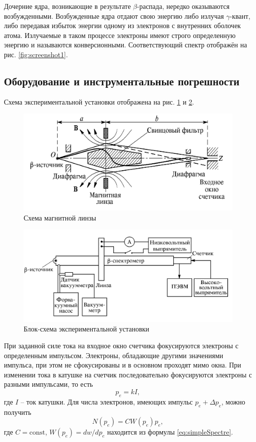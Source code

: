 \documentclass[a4paper,12pt]{article}
\theoremstyle{definition}
\newcommand{\const}{\mathrm{const}}
\newcommand{\gmm}{$\gamma $}
\newcommand{\btt}{$\beta $}
\begin{document}
	Дочерние ядра, возникающие в результате \btt-распада, нередко оказываются возбужденными. Возбужденные ядра отдают свою энергию	либо излучая \gmm-квант, либо передавая избыток энергии одному из электронов с внутренних оболочек атома. Излучаемые в таком	процессе электроны имеют строго определенную энергию и называются конверсионными.
	Соответствующий спектр отображён на рис. \ref{fig:screenshot1}.
		
	\subsection*{Оборудование и инструментальные погрешности}
		
	Схема экспериментальной установки отображена на рис. \ref{fig:screenshot2} и \ref{fig:screenshot3}.
	\begin{figure}
		\centering
		\includegraphics[width=0.7\linewidth]{Screenshot_2}
		\caption{Схема магнитной линзы}
		\label{fig:screenshot2}
	\end{figure}
	\begin{figure}
		\centering
		\includegraphics[width=0.7\linewidth]{Screenshot_3}
		\caption{Блок-схема экспериментальной установки}
		\label{fig:screenshot3}
	\end{figure}
	При заданной силе тока на входное окно счетчика фокусируются электроны с определенным импульсом. Электроны, обладающие другими значениями импульса, при этом не сфокусированы и в основном проходят мимо окна. При изменении тока в катушке на счетчик последовательно фокусируются электроны с разными	импульсами, то есть
	\begin{equation*}\label{eq:impulse}
		p_e = k I,
	\end{equation*}
	где $ I $ -- ток катушки.
	Для числа электронов, имеющих импульс $ p_e+\Delta p_e $, можно получить
	\begin{equation*}\label{eq:n_ot_Pe}
		N(p_e) = C W(p_e) p_e,
	\end{equation*}
	где $ C = \const $, $ W(p_e) = d w / d p_e $ находится из формулы \eqref{eq:simpleSpectre}.
	
\end{document}
